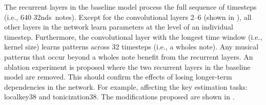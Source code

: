 
The recurrent layers in the baseline model process the full
sequence of timesteps (i.e., 640 \glspl{32nd}~notes). Except
for the convolutional layers 2--6 (shown in
), all other layers
in the network learn parameters at the level of an
individual timestep. Furthermore, the convolutional layer
with the longest time window (i.e., kernel size) learns
patterns across 32 timesteps (i.e., a \glspl{whole} note). Any
musical patterns that occur beyond a \glspl{whole} note
benefit from the recurrent layers. An ablation experiment is
proposed where the two recurrent layers in the baseline
model are removed. This should confirm the effects of losing
longer-term dependencies in the network. For example,
affecting the key estimation tasks: \gls{localkey38} and
\gls{tonicization38}. The modifications proposed are shown
in .

